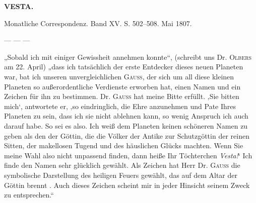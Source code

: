 \clearpage{}
\begin{center}
\textbf{VESTA.}

\hrulefill

Monatliche Correspondenz. Band XV. S. 502–508. Mai 1807.

\hrulefill
\end{center}

--- --- ---

\par\indent „Sobald ich mit einiger Gewissheit annehmen konnte“, (schreibt uns Dr. \textsc{Olbers} am 22. April) „dass ich tatsächlich der erste Entdecker dieses neuen Planeten war, bat ich unseren unvergleichlichen \textsc{Gauss}, der sich um all diese kleinen Planeten so außerordentliche Verdienste erworben hat, einen Namen und ein Zeichen für ihn zu bestimmen. Dr. \textsc{Gauss} hat meine Bitte erfüllt. ‚Sie bitten mich‘, antwortete er, ‚so eindringlich, die Ehre anzunehmen und Pate Ihres Planeten zu sein, dass ich sie nicht ablehnen kann, so wenig Anspruch ich auch darauf habe. So sei es also. Ich weiß dem Planeten keinen schöneren Namen zu geben als den der Göttin, die die Völker der Antike zur Schutzgöttin der reinen Sitten, der makellosen Tugend und des häuslichen Glücks machten. Wenn Sie meine Wahl also nicht unpassend finden, dann heiße Ihr Töchterchen \emph{Vesta!}‘ Ich finde den Namen sehr glücklich gewählt. Als Zeichen hat Herr Dr. \textsc{Gauss} die symbolische Darstellung des heiligen Feuers gewählt, das auf dem Altar der Göttin brennt \VestaAltarBody{}. Auch dieses Zeichen scheint mir in jeder Hinsicht seinem Zweck zu entsprechen.“

\begin{flushright}
\end{flushright}
